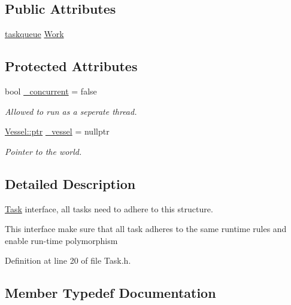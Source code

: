 \subsection*{Public Attributes}
\begin{DoxyCompactItemize}
\item 
\hyperlink{classo_cpt_1_1i_task_a8f949d091241347ea0cdfb8625b4dbca}{taskqueue} \hyperlink{classo_cpt_1_1i_task_a41287056bebbed04966072dfd1a9f80f}{Work}
\end{DoxyCompactItemize}
\subsection*{Protected Attributes}
\begin{DoxyCompactItemize}
\item 
bool \hyperlink{classo_cpt_1_1i_task_a1b6eaff4578d2ff18e70b07d00d7bb45}{\+\_\+concurrent} = false
\begin{DoxyCompactList}\small\item\em Allowed to run as a seperate thread. \end{DoxyCompactList}\item 
\hyperlink{classo_cpt_1_1i_vessel_a43711a596f3bdfd0ca732ed3901edc97}{Vessel\+::ptr} \hyperlink{classo_cpt_1_1i_task_ac6cc57220c87f87cdd4d1749119ae0cb}{\+\_\+vessel} = nullptr
\begin{DoxyCompactList}\small\item\em Pointer to the world. \end{DoxyCompactList}\end{DoxyCompactItemize}


\subsection{Detailed Description}
\hyperlink{classo_cpt_1_1_task}{Task} interface, all tasks need to adhere to this structure. 

This interface make sure that all task adheres to the same runtime rules and enable run-\/time polymorphism 

Definition at line 20 of file Task.\+h.



\subsection{Member Typedef Documentation}
\hypertarget{classo_cpt_1_1i_task_add2b02b5c97e63a1b7d6943ea4571543}{}\label{classo_cpt_1_1i_task_add2b02b5c97e63a1b7d6943ea4571543} 
